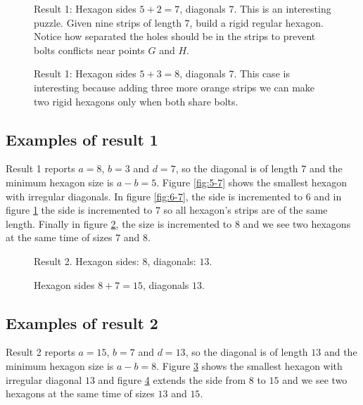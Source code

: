 \documentclass[11pt]{article}
\begin{document}
\begin{figure}
\centering
{}
\caption{Result 1: Hexagon sides $5+2=7$, diagonals $7$.
This is an interesting puzzle. Given nine strips of length 7, 
build a rigid regular hexagon. Notice how separated the holes should be in the strips
to prevent bolts conflicts near points $G$ and $H$. }
\label{fig:7-7}
\end{figure}

\begin{figure}
\centering
{}
\caption{Result 1: Hexagon sides $5+3=8$, diagonals $7$. This case is interesting
because adding three more orange strips we can make two rigid hexagons only when
both share bolts.}
\label{fig:8-7}
\end{figure}

\subsection{Examples of result 1}
Result 1 reports $a=8$, $b=3$ and $d=7$, so the diagonal is of length $7$ and the minimum hexagon size is $a - b = 5$.
Figure \ref{fig:5-7} shows the smallest hexagon with irregular diagonals.
In figure \ref{fig:6-7}, the side is incremented to $6$ and in figure \ref{fig:7-7}
the side is incremented to $7$ so all hexagon's strips are of the same length.
Finally in figure \ref{fig:8-7}, the size is incremented to $8$ and we see two
hexagons at the same time of sizes $7$ and $8$.


\begin{figure}
\centering
{}
\caption{Result 2. Hexagon sides: $8$, diagonals: $13$.}
\label{fig:8-13}
\end{figure}

\begin{figure}
\centering
{}
\caption{Hexagon sides $8+7=15$, diagonals $13$.}
\label{fig:15-13}
\end{figure}

\subsection{Examples of result 2}
Result 2 reports $a=15$, $b=7$ and $d=13$, so the diagonal is of length $13$ and the minimum
hexagon size is $a - b = 8$. Figure \ref{fig:8-13} shows the smallest hexagon with irregular
diagonal $13$ and figure \ref{fig:15-13} extends the side from $8$ to $15$ and we see two
hexagons at the same time of sizes $13$ and $15$.
\end{document}
